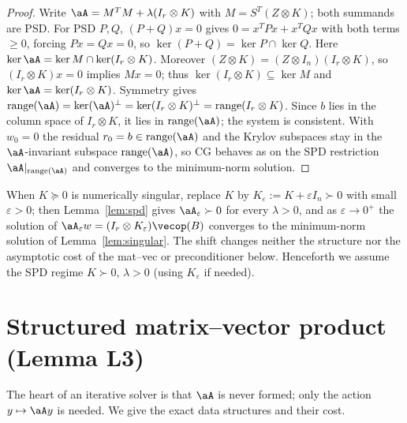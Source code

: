 \begin{proof}
Write $\aA=M^{T}M+\lambda(I_r\otimes K)$ with $M=S^{T}(Z\otimes K)$; both
summands are PSD. For PSD $P,Q$, $(P+Q)x=0$ gives
$0=x^{T}Px+x^{T}Qx$ with both terms $\ge0$, forcing $Px=Qx=0$, so
$\ker(P+Q)=\ker P\cap\ker Q$. Here
$\ker\aA=\ker M\cap\ker(I_r\otimes K)$. Moreover
$(Z\otimes K)=(Z\otimes I_n)(I_r\otimes K)$, so $(I_r\otimes K)x=0$ implies
$Mx=0$; thus $\ker(I_r\otimes K)\subseteq\ker M$ and
$\ker\aA=\ker(I_r\otimes K)$. Symmetry gives
$\operatorname{range}(\aA)=\ker(\aA)^{\perp}=\ker(I_r\otimes K)^{\perp}
=\operatorname{range}(I_r\otimes K)$. Since $b$ lies in the column space of
$I_r\otimes K$, it lies in $\operatorname{range}(\aA)$; the system is
consistent. With $w_0=0$ the residual $r_0=b\in\operatorname{range}(\aA)$ and
the Krylov subspaces stay in the $\aA$-invariant subspace
$\operatorname{range}(\aA)$, so CG behaves as on the SPD restriction
$\aA|_{\operatorname{range}(\aA)}$ and converges to the minimum-norm solution.
\end{proof}

\begin{remark}\label{rem:reg}
When $K\succeq0$ is numerically singular, replace $K$ by
$K_\varepsilon:=K+\varepsilon I_n\succ0$ with small $\varepsilon>0$; then
Lemma~\ref{lem:spd} gives $\aA_\varepsilon\succ0$ for every $\lambda>0$, and as
$\varepsilon\to0^{+}$ the solution of
$\aA_\varepsilon w=(I_r\otimes K_\varepsilon)\vecop(B)$ converges to the
minimum-norm solution of Lemma~\ref{lem:singular}. The shift changes neither
the structure nor the asymptotic cost of the mat--vec or preconditioner below.
Henceforth we assume the SPD regime $K\succ0$, $\lambda>0$ (using
$K_\varepsilon$ if needed).
\end{remark}

\section*{Structured matrix--vector product (Lemma L3)}

The heart of an iterative solver is that $\aA$ is never formed; only the action
$y\mapsto \aA y$ is needed. We give the exact data structures and their cost.

